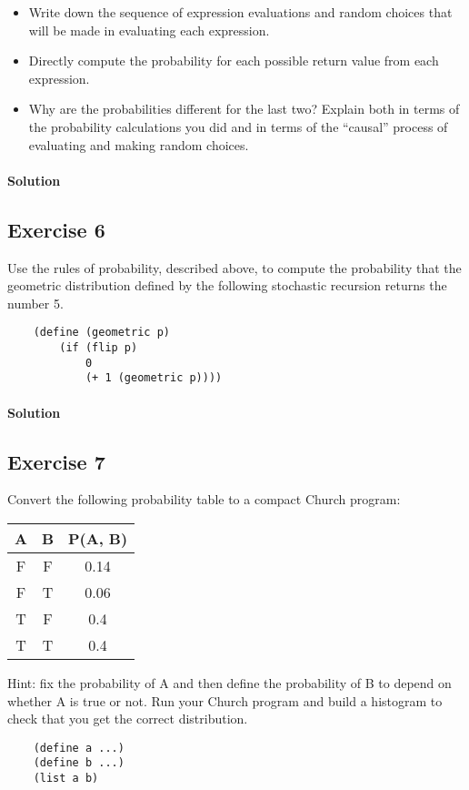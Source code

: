 \begin{itemize}
    \item[a.] Write down the sequence of expression evaluations and random choices that will be made in evaluating each expression.
    \item[b.] Directly compute the probability for each possible return value from each expression.
    \item[c.] Why are the probabilities different for the last two? Explain both in terms of the probability calculations 
        you did and in terms of the “causal” process of evaluating and making random choices.
\end{itemize}

\paragraph{Solution}


\subsection*{Exercise 6}
Use the rules of probability, described above, to compute the probability that the geometric distribution 
defined by the following stochastic recursion returns the number 5.

\begin{lstlisting}
    (define (geometric p)
        (if (flip p)
            0
            (+ 1 (geometric p))))
\end{lstlisting}

\paragraph{Solution}


\subsection*{Exercise 7}
Convert the following probability table to a compact Church program:
\begin{table}[h]
    \begin{center}
        \begin{tabular}{ccc}
            \hline
            A & B & P(A, B) \\
            \hline
            F & F & 0.14 \\
            F & T & 0.06 \\
            T & F & 0.4 \\
            T & T & 0.4 \\
            \hline
        \end{tabular}
    \end{center}
    
\end{table}

Hint: fix the probability of A and then define the probability of B to depend on whether A is true or not. 
Run your Church program and build a histogram to check that you get the correct distribution.

\begin{lstlisting}
    (define a ...)
    (define b ...)
    (list a b)
\end{lstlisting}